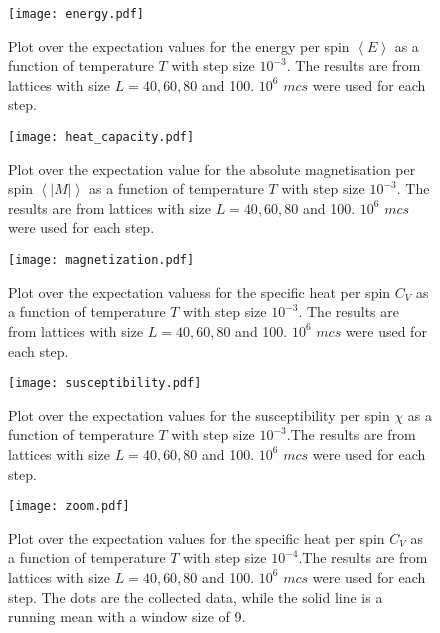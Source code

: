 \begin{figure}[htbp]
	\centering
	\texttt{[image: energy.pdf]}
	\caption{Plot over the expectation values for the energy per spin $\left\langle E\right\rangle$ as a function of temperature $T$ with step size $10^{-3}$. The results are from lattices with size $L=40,60,80$ and 100.  $10^6$ $mcs$ were used for each step.}
	\label{fig:E}
\end{figure}

\begin{figure}[htbp]
	\centering
	\texttt{[image: heat\_capacity.pdf]}
	\caption{Plot over the expectation value for the absolute magnetisation per spin $\left\langle |M|\right\rangle$ as a function of temperature $T$ with step size $10^{-3}$. The results are from lattices with size $L=40,60,80$ and 100. $10^6$ $mcs$ were used for each step.}
	\label{fig:C}
\end{figure}

\begin{figure}[htbp]
	\centering
	\texttt{[image: magnetization.pdf]}
	\caption{Plot over the expectation valuess for the specific heat per spin $C_V$ as a function of temperature $T$ with step size $10^{-3}$. The results are from lattices with size $L=40,60,80$ and 100. $10^6$ $mcs$ were used for each step.}
	\label{fig:M}
\end{figure}

\begin{figure}[htbp]
	\centering
	\texttt{[image: susceptibility.pdf]}
	\caption{Plot over the expectation values for the susceptibility per spin $\chi$ as a function of temperature $T$ with step size $10^{-3}$.The results are from lattices with size $L=40,60,80$ and 100. $10^6$ $mcs$ were used for each step.}
	\label{fig:Chi}
\end{figure}

\begin{figure}[htbp]
	\centering
	\texttt{[image: zoom.pdf]}
	\caption{Plot over the expectation values for the specific heat per spin $C_V$ as a function of temperature $T$ with step size $10^{-4}$.The results are from lattices with size $L=40,60,80$ and 100. $10^6$ $mcs$ were used for each step. The dots are the collected data, while the solid line is a running mean with a window size of 9.}
	\label{fig:zoom}
\end{figure}

